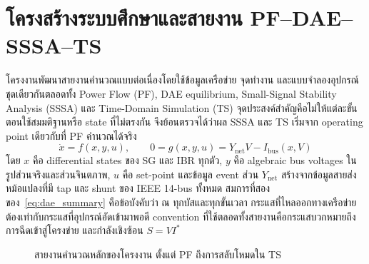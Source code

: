 \documentclass[12pt,a4paper]{article}
\begin{document}
\section{โครงสร้างระบบศึกษาและสายงาน PF--DAE--SSSA--TS}
โครงงานพัฒนาสายงานคำนวณแบบต่อเนื่องโดยใช้ข้อมูลเครือข่าย จุดทำงาน และแบบจำลองอุปกรณ์ชุดเดียวกันตลอดทั้ง Power Flow (PF), DAE equilibrium, Small-Signal Stability Analysis (SSSA) และ Time-Domain Simulation (TS) จุดประสงค์สำคัญคือไม่ให้แต่ละขั้นตอนใช้สมมติฐานหรือ state ที่ไม่ตรงกัน จึงย้อนตรวจได้ว่าผล SSSA และ TS เริ่มจาก operating point เดียวกับที่ PF คำนวณได้จริง
\begin{equation}
\dot{x}=f(x,y,u),\qquad 0=g(x,y,u)=Y_{\mathrm{net}}V-I_{\mathrm{bus}}(x,V)
\label{eq:dae_summary}
\end{equation}
โดย $x$ คือ differential states ของ SG และ IBR ทุกตัว, $y$ คือ algebraic bus voltages ในรูปส่วนจริงและส่วนจินตภาพ, $u$ คือ set-point และข้อมูล event ส่วน $Y_{\mathrm{net}}$ สร้างจากข้อมูลสายส่ง หม้อแปลงที่มี tap และ shunt ของ IEEE 14-bus ทั้งหมด สมการที่สองของ~\eqref{eq:dae_summary} คือข้อบังคับว่า ณ ทุกบัสและทุกขั้นเวลา กระแสที่ไหลออกทางเครือข่ายต้องเท่ากับกระแสที่อุปกรณ์อัดเข้ามาพอดี convention ที่ใช้ตลอดทั้งสายงานคือกระแสบวกหมายถึงการฉีดเข้าสู่โครงข่าย และกำลังเชิงซ้อน $S=VI^{*}$

\begin{figure}[H]
\centering
{}
\caption{สายงานคำนวณหลักของโครงงาน ตั้งแต่ PF ถึงการสลับโหมดใน TS}
\label{fig:pipeline}
\end{figure}
\end{document}

